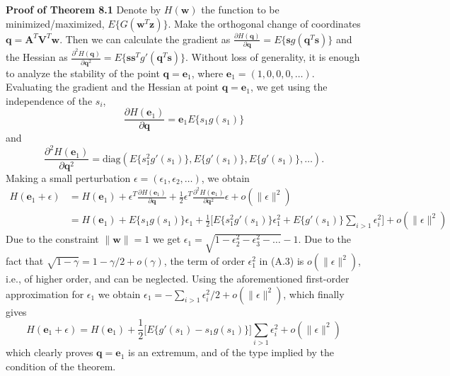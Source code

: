 \documentclass[12pt,a4paper,twoside,openany]{book}
\begin{document}
\begin{appendices}
    \textbf{Proof of Theorem 8.1} Denote by $H(\mathbf{w})$ the function to be minimized/maximized, $E\{G(\mathbf{w}^T \mathbf{z})\}$. Make the orthogonal change of coordinates $\mathbf{q} = \mathbf{A}^T \mathbf{V}^T \mathbf{w}$. Then we can calculate the gradient as $\frac{\partial H(\mathbf{q})}{\partial \mathbf{q}} = E\{\mathbf{s}g(\mathbf{q}^T \mathbf{s})\}$ and the Hessian as $\frac{\partial^2 H(\mathbf{q})}{\partial \mathbf{q}^2} = E\{\mathbf{s}\mathbf{s}^T g'(\mathbf{q}^T \mathbf{s})\}$. Without loss of generality, it is enough to analyze the stability of the point $\mathbf{q} = \mathbf{e}_1$, where $\mathbf{e}_1 = (1, 0, 0, 0, \dots)$. Evaluating the gradient and the Hessian at point $\mathbf{q} = \mathbf{e}_1$, we get using the independence of the $s_i$,
    \begin{equation}
        \frac{\partial H(\mathbf{e}_1)}{\partial \mathbf{q}} = \mathbf{e}_1 E\{s_1 g(s_1)\} \tag{A.1}
    \end{equation}
    and
    \begin{equation}
        \frac{\partial^2 H(\mathbf{e}_1)}{\partial \mathbf{q}^2} = \text{diag}(E\{s_1^2 g'(s_1)\}, E\{g'(s_1)\}, E\{g'(s_1)\}, \dots). \tag{A.2}
    \end{equation}
    Making a small perturbation $\epsilon = (\epsilon_1, \epsilon_2, \dots)$, we obtain
    \begin{equation}
    \begin{aligned}
        H(\mathbf{e}_1 + \epsilon) &= H(\mathbf{e}_1) + \epsilon^T \frac{\partial H(\mathbf{e}_1)}{\partial \mathbf{q}} + \frac{1}{2} \epsilon^T \frac{\partial^2 H(\mathbf{e}_1)}{\partial \mathbf{q}^2} \epsilon + o(\|\epsilon\|^2) \\
        &= H(\mathbf{e}_1) + E\{s_1 g(s_1)\} \epsilon_1 + \frac{1}{2} \Big[ E\{s_1^2 g'(s_1)\} \epsilon_1^2 + E\{g'(s_1)\} \sum_{i>1} \epsilon_i^2 \Big] + o(\|\epsilon\|^2)
    \end{aligned} \tag{A.3}
    \end{equation}
    Due to the constraint $\|\mathbf{w}\| = 1$ we get $\epsilon_1 = \sqrt{1 - \epsilon_2^2 - \epsilon_3^2 - \dots} - 1$. Due to the fact that $\sqrt{1 - \gamma} = 1 - \gamma/2 + o(\gamma)$, the term of order $\epsilon_1^2$ in (A.3) is $o(\|\epsilon\|^2)$, i.e., of higher order, and can be neglected. Using the aforementioned first-order approximation for $\epsilon_1$ we obtain $\epsilon_1 = - \sum_{i>1} \epsilon_i^2 / 2 + o(\|\epsilon\|^2)$, which finally gives
    \begin{equation}
        H(\mathbf{e}_1 + \epsilon) = H(\mathbf{e}_1) + \frac{1}{2} \Big[ E\{g'(s_1) - s_1 g(s_1)\} \Big] \sum_{i>1} \epsilon_i^2 + o(\|\epsilon\|^2) \tag{A.4}
    \end{equation}
    which clearly proves $\mathbf{q} = \mathbf{e}_1$ is an extremum, and of the type implied by the condition of the theorem.


\end{appendices}
\end{document}
